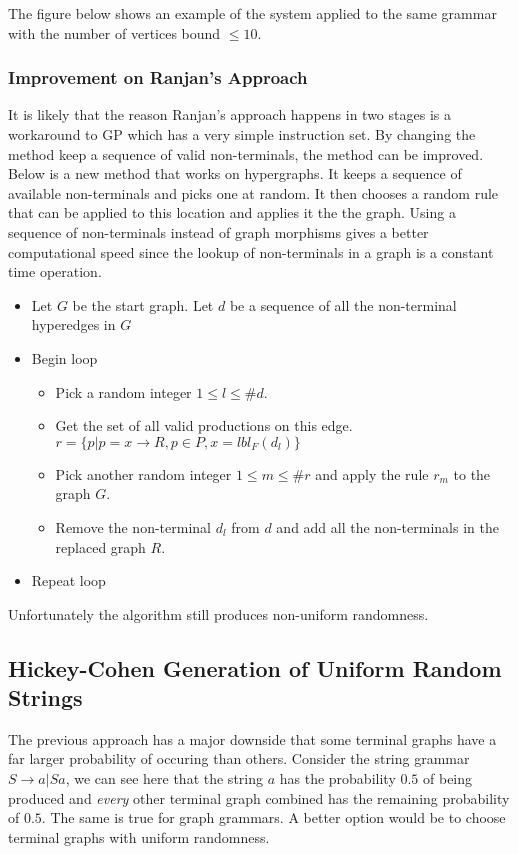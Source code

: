   The figure below shows an example of the system applied to the same grammar with the number of vertices bound $\leq 10$.
  


  \subsubsection{Improvement on Ranjan's Approach}

    It is likely that the reason Ranjan's approach happens in two stages is a workaround to GP which has a very simple instruction set. By changing the method keep a sequence of valid non-terminals, the method can be improved. Below is a new method that works on hypergraphs. It keeps a sequence of available non-terminals and picks one at random. It then chooses a random rule that can be applied to this location and applies it the the graph. Using a sequence of non-terminals instead of graph morphisms gives a better computational speed since the lookup of non-terminals in a graph is a constant time operation.

    \begin{itemize}
    \item Let $G$ be the start graph. Let $d$ be a sequence of all the non-terminal hyperedges in $G$
    \item Begin loop
    \begin{itemize}
    \item Pick a random integer $1 \leq l \leq \#d$.
    \item Get the set of all valid productions on this edge. $r = \{p | p = x \to R, p \in P, x = lbl_F(d_l)\}$
    \item Pick another random integer $1 \leq m \leq \#r$ and apply the rule $r_m$ to the graph $G$.
    \item Remove the non-terminal $d_l$ from $d$ and add all the non-terminals in the replaced graph $R$.
    \end{itemize}
    \item Repeat loop
    \end{itemize}

    Unfortunately the algorithm still produces non-uniform randomness.

  \subsection{Hickey-Cohen Generation of Uniform Random Strings}

  The previous approach has a major downside that some terminal graphs have a far larger probability of occuring than others. Consider the string grammar $S \to a | Sa$, we can see here that the string $a$ has the probability $0.5$ of being produced and \emph{every} other terminal graph combined has the remaining probability of $0.5$. The same is true for graph grammars. A better option would be to choose terminal graphs with uniform randomness.

